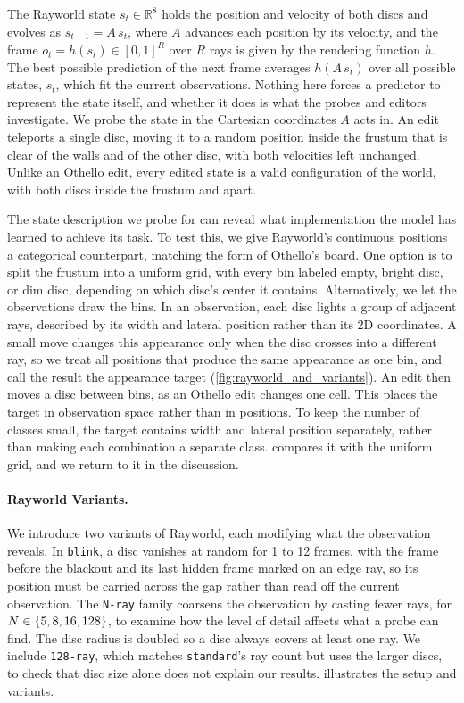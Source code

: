\documentclass{article} %
\DeclarePairedDelimiter{\set}{\{}{\}}
\begin{document}
The Rayworld state $s_t \in \mathbb{R}^8$ holds the position and velocity of both discs and evolves as $s_{t+1} = A\,s_t$, where $A$ advances each position by its velocity, and the frame $o_t = h(s_t) \in [0,1]^R$ over $R$ rays is given by the rendering function $h$. The best possible prediction of the next frame averages $h(A\,s_t)$ over all possible states, $s_t$, which fit the current observations. Nothing here forces a predictor to represent the state itself, and whether it does is what the probes and editors investigate. We probe the state in the Cartesian coordinates $A$ acts in. An edit teleports a single disc, moving it to a random position inside the frustum that is clear of the walls and of the other disc, with both velocities left unchanged. Unlike an Othello edit, every edited state is a valid configuration of the world, with both discs inside the frustum and apart.

The state description we probe for can reveal what implementation the model has learned to achieve its task. To test this, we give Rayworld's continuous positions a categorical counterpart, matching the form of Othello's board. One option is to split the frustum into a uniform grid, with every bin labeled empty, bright disc, or dim disc, depending on which disc's center it contains. Alternatively, we let the observations draw the bins. In an observation, each disc lights a group of adjacent rays, described by its width and lateral position rather than its 2D coordinates. A small move changes this appearance only when the disc crosses into a different ray, so we treat all positions that produce the same appearance as one bin, and call the result the appearance target (\cref{fig:rayworld_and_variants}). An edit then moves a disc between bins, as an Othello edit changes one cell. This places the target in observation space rather than in positions. To keep the number of classes small, the target contains width and lateral position separately, rather than making each combination a separate class.  compares it with the uniform grid, and we return to it in the discussion.

\paragraph{Rayworld Variants.}
We introduce two variants of Rayworld, each modifying what the observation reveals. In \texttt{blink}, a disc vanishes at random for 1 to 12 frames, with the frame before the blackout and its last hidden frame marked on an edge ray, so its position must be carried across the gap rather than read off the current observation. The \texttt{N-ray} family coarsens the observation by casting fewer rays, for $N \in \set{5, 8, 16, 128}$, to examine how the level of detail affects what a probe can find. The disc radius is doubled so a disc always covers at least one ray. We include \texttt{128-ray}, which matches \texttt{standard}'s ray count but uses the larger discs, to check that disc size alone does not explain our results.  illustrates the setup and variants.
\end{document}
